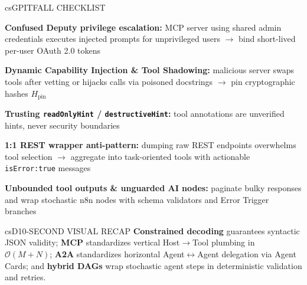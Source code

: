 \documentclass[../../../../master.tex]{subfiles}
\begin{document}
\begin{cscolumns}
\begin{cscard}{csG}{PITFALL CHECKLIST}
  \begin{csbul}
    \item \textbf{Confused Deputy privilege escalation:} MCP server using shared admin credentials executes injected prompts for unprivileged users $\to$ bind short-lived per-user OAuth 2.0 tokens
    \item \textbf{Dynamic Capability Injection \& Tool Shadowing:} malicious server swaps tools after vetting or hijacks calls via poisoned docstrings $\to$ pin cryptographic hashes $H_{\text{pin}}$
    \item \textbf{Trusting \texttt{readOnlyHint} / \texttt{destructiveHint}:} tool annotations are unverified hints, never security boundaries
    \item \textbf{1:1 REST wrapper anti-pattern:} dumping raw REST endpoints overwhelms tool selection $\to$ aggregate into task-oriented tools with actionable \texttt{isError:true} messages
    \item \textbf{Unbounded tool outputs \& unguarded AI nodes:} paginate bulky responses and wrap stochastic n8n nodes with schema validators and Error Trigger branches
  \end{csbul}
\end{cscard}

\begin{cscard}{csD}{10-SECOND VISUAL RECAP}
  \sffamily\footnotesize
  \textbf{Constrained decoding} guarantees syntactic JSON validity; \textbf{MCP} standardizes vertical Host$\to$Tool plumbing in $\mathcal{O}(M+N)$; \textbf{A2A} standardizes horizontal Agent$\leftrightarrow$Agent delegation via Agent Cards; and \textbf{hybrid DAGs} wrap stochastic agent steps in deterministic validation and retries.
\end{cscard}
\end{cscolumns}

\csend
\end{document}

